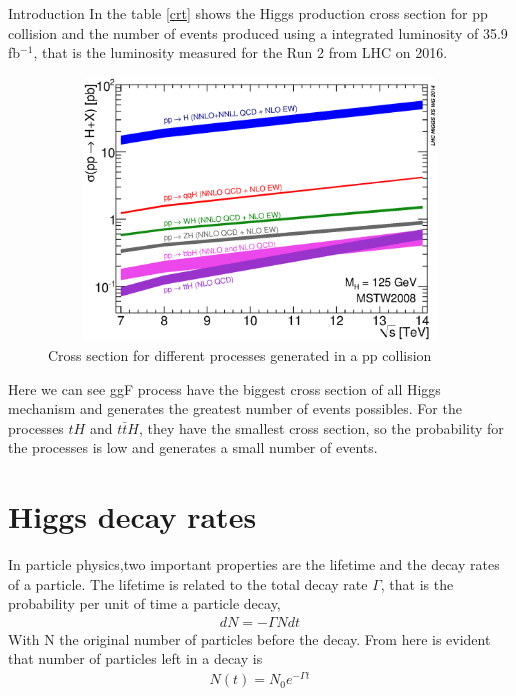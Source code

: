 \begin{chapter}{Introduction}
In the table \ref{crt} shows the Higgs production cross section for pp collision and the number of events produced using a integrated luminosity of 35.9 fb$^{-1}$, that is the luminosity measured for the Run 2 from LHC on 2016\cite{pd}.

\begin{figure}
\centering
\includegraphics[width=12cm,height=7cm]{Chapter1/7-14xsec.eps}
\caption[Cross section for different processes generated in a pp collision]{
Cross section for different processes generated in a pp collision \protect \footnotemark }
 \label{csp}
\end{figure}

Here we can see ggF process have the biggest cross section of all Higgs mechanism and generates the greatest number of events possibles. For the processes $tH$ and $t\bar{t}H$, they have the smallest cross section, so the probability for the processes is low and generates a small number of events. 
\pagebreak
{}
\section{Higgs decay rates}
In particle physics,two important properties are the lifetime and the decay rates of a particle. The lifetime is related to the total decay rate $\Gamma$, that is the probability per unit of time a particle decay, 
\begin{align}
    dN=-\Gamma N dt
\end{align}
With N the original number of particles before the decay. From here is evident that number of particles left in a decay is 
\begin{align}
N(t)=N_0 e^{-\Gamma t}
\end{align}


\end{chapter}
